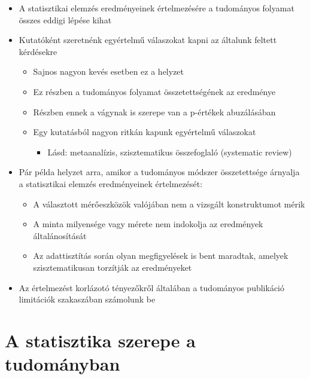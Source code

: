 \documentclass[
  letterpaper,
  DIV=11,
  numbers=noendperiod]{scrreprt}
\providecommand{\tightlist}{%
  \setlength{\itemsep}{0pt}\setlength{\parskip}{0pt}}\usepackage{longtable,booktabs,array}
\begin{document}
\begin{enumerate}
  \begin{itemize}
  \item
    A statisztikai elemzés eredményeinek értelmezésére a tudományos
    folyamat összes eddigi lépése kihat
  \item
    Kutatóként szeretnénk egyértelmű válaszokat kapni az általunk
    feltett kérdésekre

    \begin{itemize}
    \item
      Sajnos nagyon kevés esetben ez a helyzet
    \item
      Ez részben a tudományos folyamat összetettségének az eredménye
    \item
      Részben ennek a vágynak is szerepe van a p-értékek abuzálásában
    \item
      Egy kutatásból nagyon ritkán kapunk egyértelmű válaszokat

      \begin{itemize}
      \tightlist
      \item
        Lásd: metaanalízis, szisztematikus összefoglaló (systematic
        review)
      \end{itemize}
    \end{itemize}
  \item
    Pár példa helyzet arra, amikor a tudományos módszer összetettsége
    árnyalja a statisztikai elemzés eredményeinek értelmezését:

    \begin{itemize}
    \item
      A választott mérőeszközök valójában nem a vizsgált konstruktumot
      mérik
    \item
      A minta milyensége vagy mérete nem indokolja az eredmények
      általánosítását
    \item
      Az adattisztítás során olyan megfigyelések is bent maradtak,
      amelyek szisztematikusan torzítják az eredményeket
    \end{itemize}
  \item
    Az értelmezést korlázotó tényezőkről általában a tudományos
    publikáció limitációk szakaszában számolunk be
  \end{itemize}
\end{enumerate}

\hypertarget{a-statisztika-szerepe-a-tudomuxe1nyban}{%
\section{A statisztika szerepe a
tudományban}\label{a-statisztika-szerepe-a-tudomuxe1nyban}}
\end{document}
